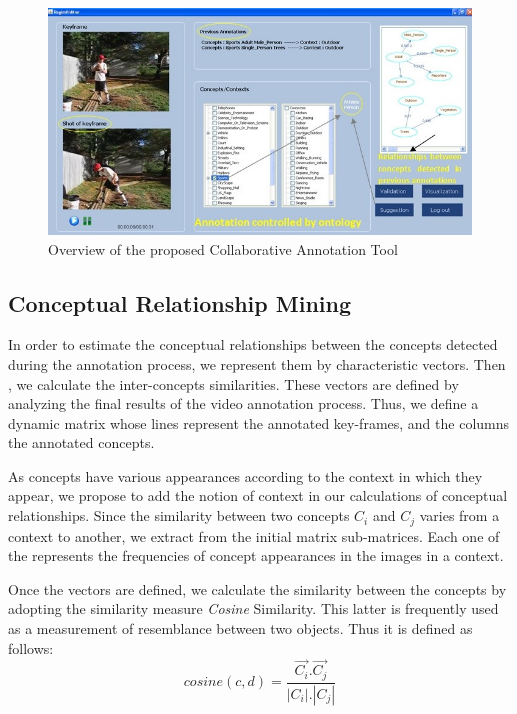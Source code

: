 	\begin{figure}[ht!]	
		\centering
		\includegraphics[width=\textwidth]{graphics/annotation_tool}
		\caption{Overview of the proposed Collaborative Annotation Tool}
		\label{annotation_tool}
	\end{figure}


	\subsection{Conceptual Relationship Mining}

	In order to estimate the conceptual relationships between the concepts detected during
	the annotation process, we represent them by characteristic vectors. Then , we calculate
	the inter-concepts similarities. These vectors are defined by analyzing the final results
	of the video annotation process. Thus, we define a dynamic matrix whose lines represent
	the annotated key-frames, and the columns  the annotated concepts.  

	As concepts have various appearances according to the context in which they appear, 
	we propose to add the notion of context in our calculations of conceptual relationships.
	Since the similarity between two concepts $C_{i}$ and $C_{j}$ varies from a context to another, 
	we extract from the initial matrix sub-matrices. Each one of the  represents the 
	frequencies of concept appearances in the images in a  context.

	Once the vectors are defined, we calculate the similarity between the concepts by adopting 
	the similarity measure \emph{Cosine} Similarity. This latter is frequently used as a measurement
	of resemblance between two objects. Thus it is defined as follows:
		\begin{equation}
				cosine(c,d) = \frac{\vec{C_{i}} . 
				\vec{C_{j}}}{|C_{i}| . |C_{j}|}
		\end{equation}

